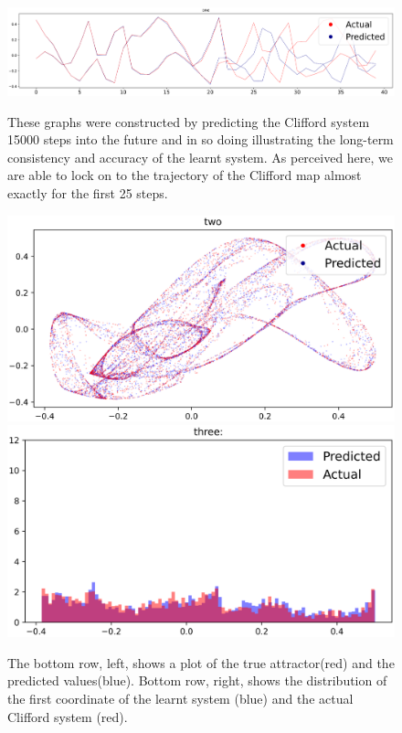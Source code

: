 \documentclass[a4paper,12pt,twoside]{report}
\begin{document}
\begin{figure}[ht]
  \centering
  \includegraphics[width=1.0\textwidth,left]{Clifford_1.eps}
  \caption*{These graphs were constructed by predicting the Clifford system 15000 steps into the future and in so doing illustrating the long-term consistency and accuracy of the learnt system. As perceived here, we are able to lock on to the trajectory of the Clifford map almost exactly for the first 25 steps.}
      \centering
      \includegraphics[width=\linewidth]{Clifford_2.eps}
  \endminipage\hfill
    \centering
    \includegraphics[width=\linewidth]{Clifford_3.eps}
  \endminipage
  \caption{The bottom row, left, shows a plot of the true attractor(red) and the predicted values(blue). Bottom row, right, shows the distribution of the first coordinate of the learnt system (blue) and the actual Clifford system (red). }
  \label{Fig_Clifford}
\end{figure}
\end{document}
